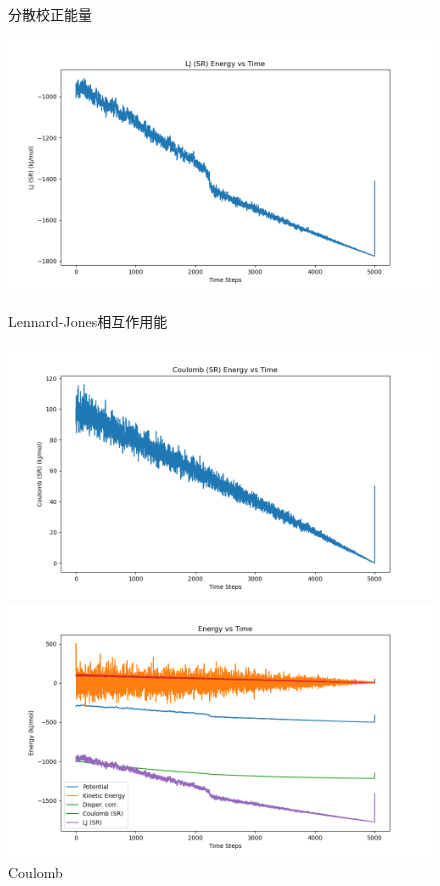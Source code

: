\documentclass[12pt, a4paper, oneside]{ctexart}
\begin{document}
\begin{spacing}{2.0}
\begin{figure}[H]
\begin{minipage}[t]{0.5\linewidth}
      \caption{分散校正能量}
      \label{fig:side:a}
    \end{minipage}%
    \begin{minipage}[t]{0.5\linewidth}
      \centering
      \includegraphics[scale=0.3]{lj_sr_energy_plot.png}
      \caption{Lennard-Jones相互作用能}
      \label{fig:side:b}
    \end{minipage}
    \begin{minipage}[t]{0.5\linewidth}
      \centering
      \includegraphics[scale=0.3]{coulomb_sr_energy_plot.png}
      \caption{Coulomb}
      \label{fig:side:b}
    \end{minipage}
    \begin{minipage}[t]{0.5\linewidth}
      \centering
      \includegraphics[scale=0.3]{analyticalfigure.png}

\end{minipage}
\end{figure}
\end{spacing}
\end{document}

